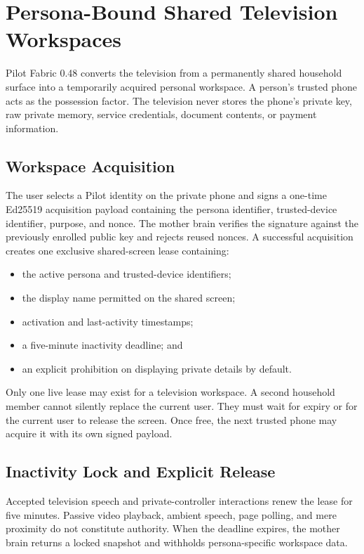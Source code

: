 \section{Persona-Bound Shared Television Workspaces}
\label{sec:pilot-shared-tv-workspace}

Pilot Fabric 0.48 converts the television from a permanently shared household
surface into a temporarily acquired personal workspace.  A person's trusted
phone acts as the possession factor.  The television never stores the phone's
private key, raw private memory, service credentials, document contents, or
payment information.

\subsection{Workspace Acquisition}

The user selects a Pilot identity on the private phone and signs a one-time
Ed25519 acquisition payload containing the persona identifier, trusted-device
identifier, purpose, and nonce.  The mother brain verifies the signature
against the previously enrolled public key and rejects reused nonces.  A
successful acquisition creates one exclusive shared-screen lease containing:

\begin{itemize}
  \item the active persona and trusted-device identifiers;
  \item the display name permitted on the shared screen;
  \item activation and last-activity timestamps;
  \item a five-minute inactivity deadline; and
  \item an explicit prohibition on displaying private details by default.
\end{itemize}

Only one live lease may exist for a television workspace.  A second household
member cannot silently replace the current user.  They must wait for expiry or
for the current user to release the screen.  Once free, the next trusted phone
may acquire it with its own signed payload.

\subsection{Inactivity Lock and Explicit Release}

Accepted television speech and private-controller interactions renew the
lease for five minutes.  Passive video playback, ambient speech, page polling,
and mere proximity do not constitute authority.  When the deadline expires,
the mother brain returns a locked snapshot and withholds persona-specific
workspace data.

